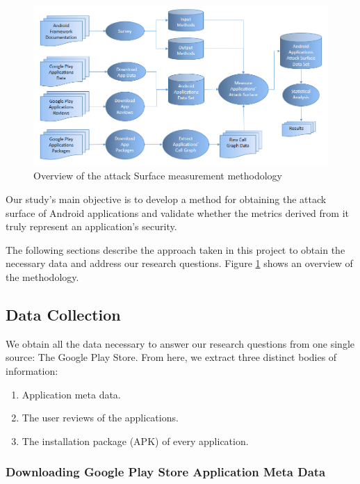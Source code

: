 \documentclass{sig-alternate}
\begin{document}
\begin{figure}
  \centering
  \includegraphics[scale=0.45]{figs/methodology.png}
  \caption{Overview of the attack Surface measurement methodology}
  \label{fig:methodology}
\end{figure}

Our study's main objective is to develop a method for obtaining the attack surface of Android applications and validate whether the metrics derived from it truly represent an application's security.

The following sections describe the approach taken in this project to obtain the necessary data and address our research questions. Figure \ref{fig:methodology} shows an overview of the methodology.

\subsection{Data Collection}

We obtain all the data necessary to answer our research questions from one single source: The Google Play Store. From here, we extract three distinct bodies of information: 

\begin{enumerate}
\item Application meta data.
\item The user reviews of the applications.
\item The installation package (APK) of every application.
\end{enumerate}

\subsubsection{Downloading Google Play Store Application Meta Data}
\end{document}
